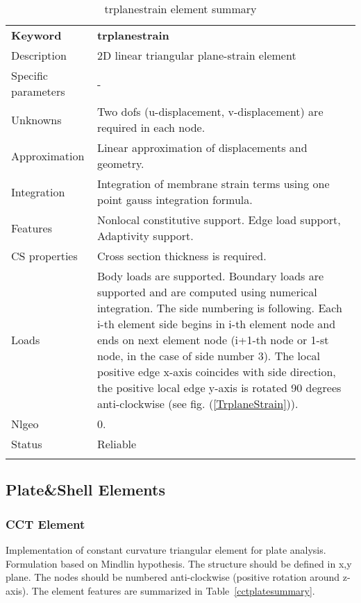 \documentclass[a4paper]{article}
\newcommand{\param}[1]{\texttt{#1}} %
\newcommand{\templabel}{}%
\newcommand{\tempcaption}{}%
\newcounter{nelpar}
\newenvironment{elementsummary}[5]{%
  \gdef\tempcaption{#4}%
  \gdef\templabel{#5}%
  \setcounter{nelpar}{0}%
  \begin{center} %
    \begin{table}[!htb] %
      \begin{tabular}{|l|p{9cm}|}\hline %
        {\bf Keyword} & \bf{#1}\\ %
        {Description} & {#2}\\ %
        {Specific parameters} & {#3}\\ \hline %
}{%
  \\ \hline %
      \end{tabular}%
      \caption{\tempcaption}%
      \label{\templabel}%
    \end{table}%
  \end{center}%
}
\newcommand{\elementParam}[1]{%
  \ifthenelse{\value{nelpar}>0} %
             {&{#1}}%
             {\setcounter{nelpar}{1}Parameters&{#1}}%
             \\%
}
\newcommand{\elementDescription}[2]{{#1} & {#2}\\ }
\begin{document}
\begin{elementsummary}{trplanestrain}{2D linear triangular plane-strain element}{-}{trplanestrain element summary}{trplanestrainsummary}
\elementDescription{Unknowns}{Two dofs (u-displacement, v-displacement) are required in each node.}
\elementDescription{Approximation}{Linear approximation of displacements and geometry.}
\elementDescription{Integration}{Integration of membrane strain terms using one point gauss integration formula.}
\elementDescription{Features}{Nonlocal constitutive support. Edge load support, Adaptivity support.}
\elementDescription{CS properties}{Cross section thickness is required.}
\elementDescription{Loads}{Body loads are supported. Boundary loads are supported and are computed  using numerical integration. The side numbering is following. Each i-th element side begins in i-th element node and ends on next element node (i+1-th node or 1-st node, in the case of side number 3). The local positive edge x-axis coincides with side direction, the positive local edge y-axis is rotated 90 degrees anti-clockwise (see fig. (\ref{TrplaneStrain})).}
\elementDescription{Nlgeo}{0.}
\elementDescription{Status}{Reliable}
\end{elementsummary}




\clearpage
\subsection{Plate\&Shell Elements}
\subsubsection {CCT Element}
\label{cct}
Implementation of constant curvature triangular element for plate
analysis. Formulation based on Mindlin hypothesis. The structure should be defined in x,y plane. 
The nodes should be numbered anti-clockwise (positive rotation around
z-axis). The element features are summarized in Table~\ref{cctplatesummary}.
\end{document}
